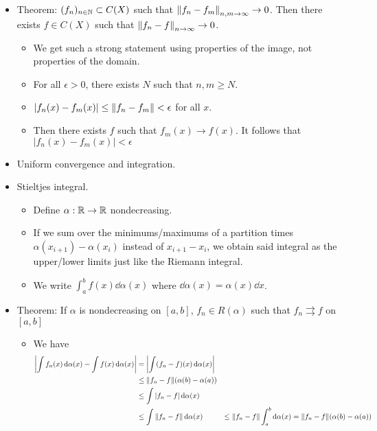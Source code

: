 \documentclass[../../notes.tex]{subfiles}
\begin{document}
\begin{itemize}
\begin{itemize}
    \end{itemize}
    \item Theorem: $(f_n)_{n\in\mathbb{N}}\subset C(X)$ such that $\norm{f_n-f_m}_{n,m\to\infty}\to 0$. Then there exists $f\in C(X)$ such that $\norm{f_n-f}_{n\to\infty}\to 0$.
    \begin{itemize}
        \item We get such a strong statement using properties of the image, not properties of the domain.
        \item For all $\epsilon>0$, there exists $N$ such that $n,m\geq N$.
        \item $|f_n(x)-f_m(x)|\leq\norm{f_n-f_m}<\epsilon$ for all $x$.
        \item Then there exists $f$ such that $f_m(x)\to f(x)$. It follows that $|f_n(x)-f_m(x)|<\epsilon$
    \end{itemize}
    \item Uniform convergence and integration.
    \item Stieltjes integral.
    \begin{itemize}
        \item Define $\alpha:\mathbb{R}\to\mathbb{R}$ nondecreasing.
        \item If we sum over the minimums/maximums of a partition times $\alpha(x_{i+1})-\alpha(x_i)$ instead of $x_{i+1}-x_i$, we obtain said integral as the upper/lower limits just like the Riemann integral.
        \item We write $\int_a^bf(x)\dd{\alpha(x)}$ where $\dd{\alpha(x)}=\alpha(x)\dd{x}$.
    \end{itemize}
    \item Theorem: If $\alpha$ is nondecreasing on $[a,b]$, $f_n\in R(\alpha)$ such that $f_n\rightrightarrows f$ on $[a,b]$
    \begin{itemize}
        \item We have
        \begin{align*}
            \left| \int f_n(x)\dd{\alpha(x)}-\int f(x)\dd{\alpha(x)} \right| &= \left| \int (f_n-f)(x)\dd{\alpha(x)}\right|\\
            &\leq \norm{f_n-f}(\alpha(b)-\alpha(a))\\
            &\leq \int|f_n-f|\dd{\alpha(x)}\\
            &\leq \int\norm{f_n-f}\dd{\alpha(x)}
            &\leq \norm{f_n-f}\int_a^b\dd{\alpha(x)}
            &= \norm{f_n-f}(\alpha(b)-\alpha(a))
        \end{align*}
    \end{itemize}

\end{itemize}
\end{document}
